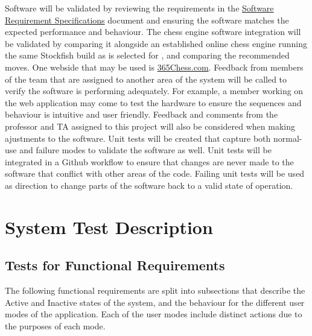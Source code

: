 \documentclass[12pt, titlepage]{article}
\begin{document}
Software will be validated by reviewing the requirements in the \href{file:../SRS/SRS.pdf}{Software Requirement Specifications} document and ensuring the software matches the expected performance and behaviour. The chess engine software integration will be validated by comparing it alongside an established online chess engine running the same Stockfish build as is selected for \progname{}, and comparing the recommended moves. One webside that may be used is \href{https://www.365chess.com/analysis_board.php}{365Chess.com}.
\newline
\newline
Feedback from members of the team that are assigned to another area of the system will be called to verify the software is performing adequately. 
For example, a member working on the web application may come to test the hardware to ensure the sequences and behaviour is intuitive and user friendly. 
Feedback and comments from the professor and TA assigned to this project will also be considered when making ajustments to the software.
\newline
\newline
Unit tests will be created that capture both normal-use and failure modes to validate the software as well. Unit tests will be integrated in a Github workflow to ensure that changes are never made to the software that conflict with other areas of the code. Failing unit tests will be used as direction to change parts of the software back to a valid state of operation.




\section{System Test Description} \label{SystemTests}
	
\subsection{Tests for Functional Requirements}

The following functional requirements are split into subsections 
that describe the Active and Inactive states of the
system, and the behaviour for the different user modes of the application.
Each of the user modes include distinct actions due to the purposes of each mode. 
\end{document}
